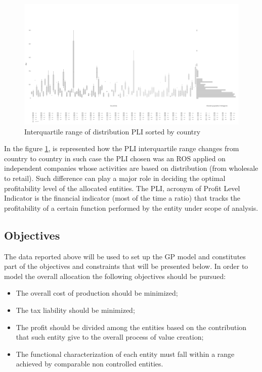 \begin{doublespace}
\begin{figure}
\centering
\includegraphics[width=\textwidth]{Images/plidist1.png}
\caption{Interquartile range of distribution PLI sorted by country}
\label{fig:interquartile}
\end{figure}

In the figure \ref{fig:interquartile}, is represented how the PLI interquartile range changes from country to country in such case the PLI chosen was an ROS applied on independent companies whose activities are  based on distribution (from wholesale to retail). Such difference can play a major role in deciding the optimal profitability level of the allocated entities. The PLI, acronym of Profit Level Indicator is the financial indicator (most of the time a ratio) that tracks the profitability of a certain function performed by the entity under scope of analysis.

\subsection{Objectives}
The data reported above will be used to set up the GP model and constitutes part of the objectives and constraints that will be presented below. In order to model the overall allocation the following objectives should be pursued:
\begin{itemize}
    \item The overall cost of production should be minimized;
    \item The tax liability should be minimized;
    \item The profit should be divided among the entities based on the contribution that such entity give to the overall process of value creation;
    \item The functional characterization of each entity must fall within a range achieved by comparable non controlled entities.
\end{itemize}


\end{doublespace}
